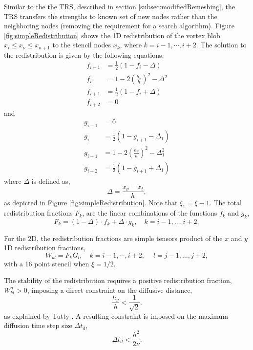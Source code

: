 Similar to the the TRS, described in section \ref{subsec:modifiedRemeshing}, the TRS transfers the strengths to known set of new nodes rather than the neighboring nodes (removing the requirement for a search algorithm). Figure \ref{fig:simpleRedistribution} shows the 1D redistribution of the vortex blob $x_i \leqslant x_{\nu} \leqslant x_{n+1}$ to the stencil nodes $x_k$, where $k=i-1,\cdots,i+2$. The solution to the redistribution is given by the following equations,
	\begin{subequations}
	\begin{align}
	f_{i-1} &= \frac{1}{2}\left(1-f_i-\Delta\right)\\
	f_i &= 1 - 2\left(\frac{h_{\nu}}{h}\right)^2 - \Delta^2\\
	f_{i+1} &= \frac{1}{2}\left(1-f_i+\Delta\right)\\
	f_{i+2} &= 0
	\end{align}
	\end{subequations}
and 	
	\begin{subequations}
	\begin{align}
	g_{i-1} &= 0\\
	g_{i} &= \frac{1}{2}\left(1-g_{i+1}-\Delta_1\right)\\
	g_{i+1} &= 1 - 2\left(\frac{h_{\nu}}{h}\right)^2 - \Delta_1^2\\
	g_{i+2} &= \frac{1}{2}\left(1-g_{i+1}+\Delta_1\right)
	\end{align}
	\end{subequations}
where $\Delta$ is defined as,
	\begin{equation}
	\Delta = \frac{x_{\nu}-x_i}{h},
	\end{equation}
as depicted in Figure \ref{fig:simpleRedistribution}. Note that $\xi_1 = \xi - 1$. The total redistribution fractions $F_k$, are the linear combinations of the functions $f_k$ and $g_k$,
	\begin{equation}
	F_k = \left(1-\Delta\right)\cdot f_k + \Delta\cdot g_k, \quad k = i-1,\dots,i+2,
	\end{equation}

For the 2D, the redistribution fractions are simple tensors product of the $x$ and $y$ 1D redistribution fractions,
	\begin{equation}
	W_{kl} = F_k G_l, \quad k = i-1,\cdots,i+2, \quad\ l = j-1,\dots,j+2,
	\end{equation}
with a 16 point stencil when $\xi=1/2$.

The stability of the redistribution requires a positive redistribution fraction, $W_{kl}^n > 0$, imposing a direct constraint on the diffusive distance,
	\begin{equation}
	\frac{h_{\nu}}{h} < \frac{1}{\sqrt{2}}.
	\end{equation}
as explained by Tutty \cite{Tutty2010a}. A resulting constraint is imposed on the maximum diffusion time step size $\Delta t_d$,
	\begin{equation}
	\Delta t_d < \frac{h^2}{2\nu}.
	\label{eq:TRS_difftimeconstr}
	\end{equation}

